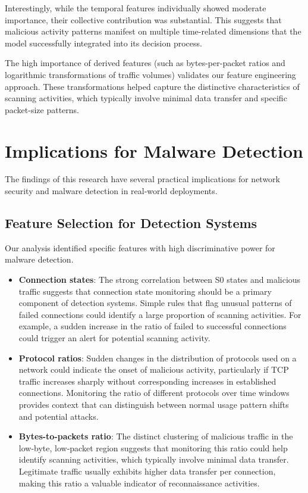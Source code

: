 Interestingly, while the temporal features individually showed moderate importance, their collective contribution was substantial. This suggests that malicious activity patterns manifest on multiple time-related dimensions that the model successfully integrated into its decision process.

The high importance of derived features (such as bytes-per-packet ratios and logarithmic transformations of traffic volumes) validates our feature engineering approach. These transformations helped capture the distinctive characteristics of scanning activities, which typically involve minimal data transfer and specific packet-size patterns.

\section{Implications for Malware Detection}

The findings of this research have several practical implications for network security and malware detection in real-world deployments.

\subsection{Feature Selection for Detection Systems}

Our analysis identified specific features with high discriminative power for malware detection.

\begin{itemize}
    \item \textbf{Connection states}: The strong correlation between S0 states and malicious traffic suggests that connection state monitoring should be a primary component of detection systems. Simple rules that flag unusual patterns of failed connections could identify a large proportion of scanning activities. For example, a sudden increase in the ratio of failed to successful connections could trigger an alert for potential scanning activity.
    
    \item \textbf{Protocol ratios}: Sudden changes in the distribution of protocols used on a network could indicate the onset of malicious activity, particularly if TCP traffic increases sharply without corresponding increases in established connections. Monitoring the ratio of different protocols over time windows provides context that can distinguish between normal usage pattern shifts and potential attacks.
    
    \item \textbf{Bytes-to-packets ratio}: The distinct clustering of malicious traffic in the low-byte, low-packet region suggests that monitoring this ratio could help identify scanning activities, which typically involve minimal data transfer. Legitimate traffic usually exhibits higher data transfer per connection, making this ratio a valuable indicator of reconnaissance activities.
\end{itemize}

